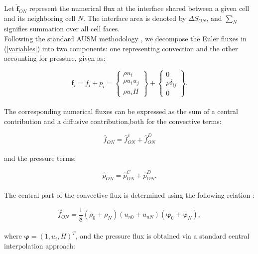 \documentclass[a5paper]{sapthesis}
\begin{document}
	\noindent Let $\mathbf{\hat{f}}_{ON}$ represent the numerical flux at the interface shared between a given cell and its neighboring cell $N$. The interface area is denoted by $\Delta S_{ON}$, and $\sum_N$ signifies summation over all cell faces.
	\\
	Following the standard AUSM methodology \cite{LIOU_AUSM}, we decompose the Euler fluxes in (\ref{variables})  into two components: one representing convection and the other accounting for pressure, given as:
	
	\begin{equation}
		\mathbf{f}_i = f_i + p_i =
		\begin{Bmatrix}
			\rho u_i \\
			\rho u_i u_j \\
			\rho u_i H
		\end{Bmatrix}
		+
		\begin{Bmatrix}
			0 \\
			p \delta_{ij} \\
			0
		\end{Bmatrix}.
	\end{equation}
	\\
	The corresponding numerical fluxes can be expressed as the sum of a central contribution and a diffusive contribution,both for the convective terms:
	
	\begin{equation}
		\hat{f}_{ON} = \hat{f}^{c}_{ON} + \hat{f}^{D}_{ON}
		\label{convective_central_diffusive_fluxes}
	\end{equation}
	\\
	and the pressure terms:
	
	\begin{equation}
		\hat{p}_{ON} = \hat{p}^{C}_{ON} + \hat{p}^{D}_{ON}.
		\label{diffusive_central_diffusive_fluxes}
	\end{equation}
	\\
	The central part of the convective flux is determined using the following relation \cite{PIROZZOLI20107180}:
	
	\begin{equation}
		\hat{f}^{c}_{ON} = \frac{1}{8} (\rho_0 + \rho_N) (u_{n0} + u_{nN}) (\boldsymbol{\varphi}_0 + \boldsymbol{\varphi}_N),
		\label{PirozzoliFLux}
	\end{equation}
	\\
	where $\boldsymbol{\varphi} = (1, u_i, H)^T$, and the pressure flux is obtained via a standard central interpolation approach:
	
\end{document}
